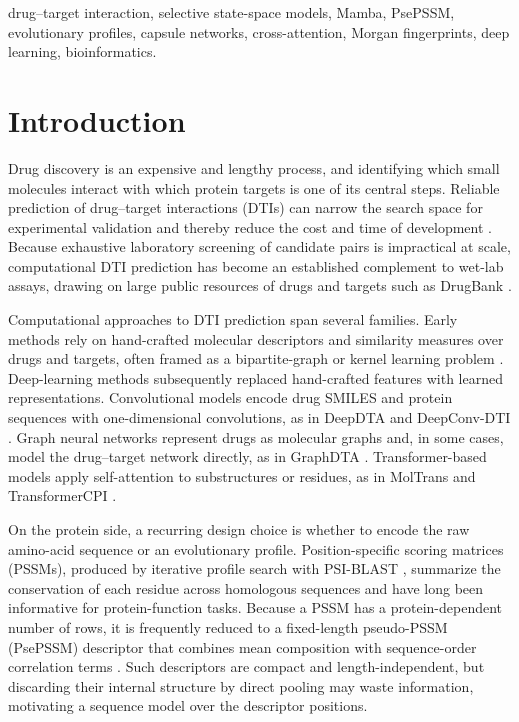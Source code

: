 \documentclass[conference]{IEEEtran}
\begin{document}
\begin{IEEEkeywords}
drug--target interaction, selective state-space models, Mamba, PsePSSM,
evolutionary profiles, capsule networks, cross-attention, Morgan fingerprints,
deep learning, bioinformatics.
\end{IEEEkeywords}

\section{Introduction}
Drug discovery is an expensive and lengthy process, and identifying which small
molecules interact with which protein targets is one of its central steps.
Reliable prediction of drug--target interactions (DTIs) can narrow the search
space for experimental validation and thereby reduce the cost and time of
development \cite{ref_yamanishi}. Because exhaustive laboratory screening of
candidate pairs is impractical at scale, computational DTI prediction has become
an established complement to wet-lab assays, drawing on large public resources of
drugs and targets such as DrugBank \cite{ref_drugbank}.

Computational approaches to DTI prediction span several families. Early methods
rely on hand-crafted molecular descriptors and similarity measures over drugs
and targets, often framed as a bipartite-graph or kernel learning problem
\cite{ref_yamanishi}. Deep-learning methods subsequently replaced hand-crafted
features with learned representations. Convolutional models encode drug SMILES
and protein sequences with one-dimensional convolutions, as in DeepDTA
\cite{ref_deepdta} and DeepConv-DTI \cite{ref_deepconvdti}. Graph neural networks
represent drugs as molecular graphs and, in some cases, model the drug--target
network directly, as in GraphDTA \cite{ref_graphdta}. Transformer-based models
apply self-attention to substructures or residues, as in MolTrans
\cite{ref_moltrans} and TransformerCPI \cite{ref_transformercpi}.

On the protein side, a recurring design choice is whether to encode the raw
amino-acid sequence or an evolutionary profile. Position-specific scoring
matrices (PSSMs), produced by iterative profile search with PSI-BLAST
\cite{ref_psiblast}, summarize the conservation of each residue across
homologous sequences and have long been informative for protein-function tasks.
Because a PSSM has a protein-dependent number of rows, it is frequently reduced
to a fixed-length pseudo-PSSM (PsePSSM) descriptor that combines mean
composition with sequence-order correlation terms \cite{ref_psepssm}. Such
descriptors are compact and length-independent, but discarding their internal
structure by direct pooling may waste information, motivating a sequence model
over the descriptor positions.
\end{document}
